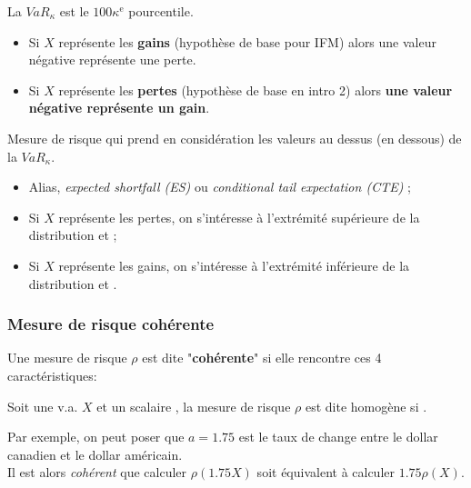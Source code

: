 \documentclass[10pt, french]{article}
\begin{document}
\begin{multicols*}{2}
\begin{definitionNOHFILL}
La $VaR_{\kappa}$ est le $100\kappa^{\text{e}}$ pourcentile.

\begin{itemize}
	\item	Si $X$ représente les \textbf{gains} (hypothèse de base pour IFM) alors une valeur négative représente une perte.
	\item	Si $X$ représente les \textbf{pertes} (hypothèse de base en intro 2) alors \textbf{une valeur négative représente un gain}.
\end{itemize}
\end{definitionNOHFILL}

\begin{definitionNOHFILL}
Mesure de risque qui prend en considération les valeurs au dessus (en dessous) de la $VaR_{\kappa}$.

\begin{itemize}[leftmargin = *]
	\item	Alias, \og \textit{expected shortfall (ES)} \fg{} ou \og \textit{conditional tail expectation (CTE)} \fg{} ;
	\item	Si $X$ représente les pertes, on s'intéresse à l'extrémité supérieure de la distribution et  ;
	\item	Si $X$ représente les gains, on s'intéresse à l'extrémité inférieure de la distribution et .
\end{itemize}
\end{definitionNOHFILL}


\columnbreak
\subsubsection{Mesure de risque cohérente}
Une mesure de risque $\rho$ est dite "\textbf{cohérente}" si elle rencontre ces 4 caractéristiques:
\begin{definitionNOHFILLsub}[Homogénéité]
Soit une v.a. $X$ et un scalaire , la mesure de risque $\rho$ est dite homogène si .

\begin{rappel_enhanced}[Interprétation]
Par exemple, on peut poser que $a	=	1.75$ est le taux de change entre le dollar canadien et le dollar américain.\\
Il est alors \textit{cohérent} que calculer $\rho(1.75X)$ soit équivalent à calculer $1.75\rho(X)$.
\end{rappel_enhanced}
\end{definitionNOHFILLsub}


\end{multicols*}
\end{document}
